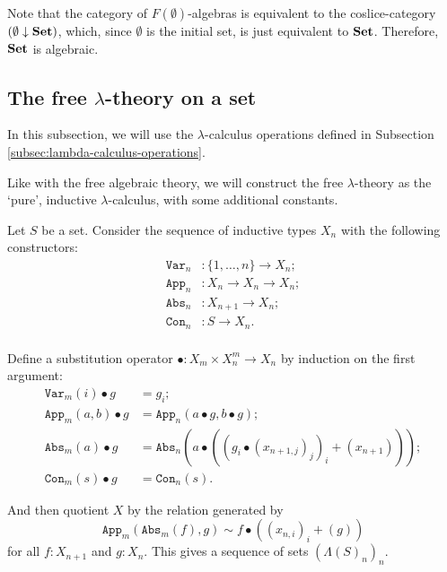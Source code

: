 \begin{remark}\label{rem:free-theory-algebra-set}
  Note that the category of $ F(\emptyset) $-algebras is equivalent to the coslice-category $ (\emptyset \downarrow \mathbf{Set}) $, which, since $ \emptyset $ is the initial set, is just equivalent to $ \mathbf{Set} $. Therefore, $ \mathbf{Set} $ is algebraic.
\end{remark}

\subsection{The free \texorpdfstring{$ \lambda $}{lambda}-theory on a set}

In this subsection, we will use the $ \lambda $-calculus operations defined in Subsection \ref{subsec:lambda-calculus-operations}.

Like with the free algebraic theory, we will construct the free $ \lambda $-theory as the `pure', inductive $ \lambda $-calculus, with some additional constants.

Let $ S $ be a set. Consider the sequence of inductive types $ X_n $ with the following constructors:
\begin{align*}
  \mathtt{Var}_n &: \{ 1, \dots, n \} \to X_n;\\
  \mathtt{App}_n &: X_n \to X_n \to X_n;\\
  \mathtt{Abs}_n &: X_{n + 1} \to X_n;\\
  \mathtt{Con}_n &: S \to X_n.\\
\end{align*}

Define a substitution operator $ \bullet: X_m \times X_n^m \to X_n $ by induction on the first argument:
\begin{align*}
  \mathtt{Var}_m(i) \bullet g &= g_i;\\
  \mathtt{App}_m(a, b) \bullet g &= \mathtt{App}_n(a \bullet g, b \bullet g);\\
  \mathtt{Abs}_m(a) \bullet g &= \mathtt{Abs}_n(a \bullet ((g_i \bullet (x_{n + 1, j})_j)_i + (x_{n + 1})));\\
  \mathtt{Con}_m(s) \bullet g &= \mathtt{Con}_n(s).
\end{align*}

And then quotient $ X $ by the relation generated by
\[ \mathtt{App}_m(\mathtt{Abs}_m(f), g) \sim f \bullet ((x_{n, i})_i + (g)) \]
for all $ f: X_{n + 1} $ and $ g: X_n $. This gives a sequence of sets $ (\Lambda(S)_n)_n $.

